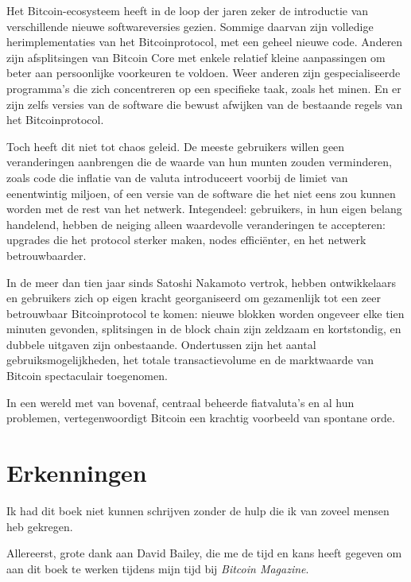 \documentclass[
  a5paper,
  smalldemyvopaper,11pt,twoside,onecolumn,openright,extrafontsizes]{memoir}
\begin{document}
Het Bitcoin-ecosysteem heeft in de loop der jaren zeker de introductie
van verschillende nieuwe softwareversies gezien. Sommige daarvan zijn
volledige herimplementaties van het Bitcoinprotocol, met een geheel
nieuwe code. Anderen zijn afsplitsingen van Bitcoin Core met enkele
relatief kleine aanpassingen om beter aan persoonlijke voorkeuren te
voldoen. Weer anderen zijn gespecialiseerde programma's die zich
concentreren op een specifieke taak, zoals het minen. En er zijn zelfs
versies van de software die bewust afwijken van de bestaande regels van
het Bitcoinprotocol.

Toch heeft dit niet tot chaos geleid. De meeste gebruikers willen geen
veranderingen aanbrengen die de waarde van hun munten zouden
verminderen, zoals code die inflatie van de valuta introduceert voorbij
de limiet van eenentwintig miljoen, of een versie van de software die
het niet eens zou kunnen worden met de rest van het netwerk.
Integendeel: gebruikers, in hun eigen belang handelend, hebben de
neiging alleen waardevolle veranderingen te accepteren: upgrades die het
protocol sterker maken, nodes efficiënter, en het netwerk
betrouwbaarder.

In de meer dan tien jaar sinds Satoshi Nakamoto vertrok, hebben
ontwikkelaars en gebruikers zich op eigen kracht georganiseerd om
gezamenlijk tot een zeer betrouwbaar Bitcoinprotocol te komen: nieuwe
blokken worden ongeveer elke tien minuten gevonden, splitsingen in de
block chain zijn zeldzaam en kortstondig, en dubbele uitgaven zijn
onbestaande. Ondertussen zijn het aantal gebruiksmogelijkheden, het
totale transactievolume en de marktwaarde van Bitcoin spectaculair
toegenomen.

In een wereld met van bovenaf, centraal beheerde fiatvaluta's en al hun
problemen, vertegenwoordigt Bitcoin een krachtig voorbeeld van spontane
orde.


\chapter*{Erkenningen}\label{erkenningen}


Ik had dit boek niet kunnen schrijven zonder de hulp die ik van zoveel
mensen heb gekregen.

Allereerst, grote dank aan David Bailey, die me de tijd en kans heeft
gegeven om aan dit boek te werken tijdens mijn tijd bij \emph{Bitcoin
Magazine}.
\end{document}
